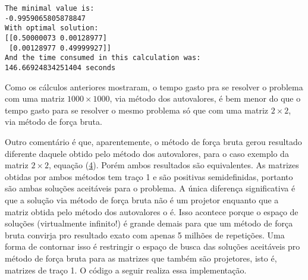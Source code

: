 \documentclass[11pt]{article}
\begin{document}
    \begin{Verbatim}[commandchars=\\\{\}]
The minimal value is:
-0.9959065805878847
With optimal solution:
[[0.50000073 0.00128977]
 [0.00128977 0.49999927]]
And the time consumed in this calculation was:
146.66924834251404 seconds
    \end{Verbatim}

    Como os cálculos anteriores mostraram, o tempo gasto pra se resolver o
problema com uma matriz \(1000\times 1000\), via método dos autovalores,
é bem menor do que o tempo gasto para se resolver o mesmo problema só
que com uma matriz \(2\times 2\), via método de força bruta.

Outro comentário é que, aparentemente, o método de força bruta gerou
resultado diferente daquele obtido pelo método dos autovalores, para o
caso exemplo da matriz \(2\times 2\), equação
(\hyperref[mjx-eqn-eq4]{4}). Porém ambos resultados são equivalentes. As
matrizes obtidas por ambos métodos tem traço 1 e são positivas
semidefinidas, portanto são ambas soluções aceitáveis para o problema. A
única diferença significativa é que a solução via método de força bruta
não é um projetor enquanto que a matriz obtida pelo método dos
autovalores o é. Isso acontece porque o espaço de soluções (virtualmente
infinito!) é grande demais para que um método de força bruta convirja
pro resultado exato com apenas 5 milhões de repetições. Uma forma de
contornar isso é restringir o espaço de busca das soluções aceitáveis
pro método de força bruta para as matrizes que também são projetores,
isto é, matrizes de traço 1. O código a seguir realiza essa
implementação.
\end{document}
